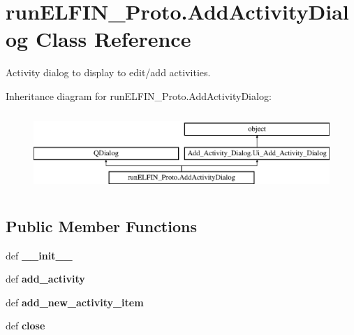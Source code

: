 \hypertarget{classrunELFIN__Proto_1_1AddActivityDialog}{\section{run\-E\-L\-F\-I\-N\-\_\-\-Proto.\-Add\-Activity\-Dialog Class Reference}
\label{classrunELFIN__Proto_1_1AddActivityDialog}
}


Activity dialog to display to edit/add activities.  


Inheritance diagram for run\-E\-L\-F\-I\-N\-\_\-\-Proto.\-Add\-Activity\-Dialog\-:\begin{figure}[H]
\begin{center}
\leavevmode
\includegraphics[height=3.000000cm]{classrunELFIN__Proto_1_1AddActivityDialog}
\end{center}
\end{figure}
\subsection*{Public Member Functions}
\begin{DoxyCompactItemize}
\item 
\hypertarget{classrunELFIN__Proto_1_1AddActivityDialog_a471b245c26d4148a8c9575e8ce075c5b}{def {\bfseries \-\_\-\-\_\-init\-\_\-\-\_\-}}\label{classrunELFIN__Proto_1_1AddActivityDialog_a471b245c26d4148a8c9575e8ce075c5b}

\item 
\hypertarget{classrunELFIN__Proto_1_1AddActivityDialog_a154107cc596262338c88ecd63713cef5}{def {\bfseries add\-\_\-activity}}\label{classrunELFIN__Proto_1_1AddActivityDialog_a154107cc596262338c88ecd63713cef5}

\item 
\hypertarget{classrunELFIN__Proto_1_1AddActivityDialog_a2dbd21f4cd94130413857ac9954fc325}{def {\bfseries add\-\_\-new\-\_\-activity\-\_\-item}}\label{classrunELFIN__Proto_1_1AddActivityDialog_a2dbd21f4cd94130413857ac9954fc325}

\item 
\hypertarget{classrunELFIN__Proto_1_1AddActivityDialog_a13af5c9e50240aa9b2ec22709ff4b8be}{def {\bfseries close}}\label{classrunELFIN__Proto_1_1AddActivityDialog_a13af5c9e50240aa9b2ec22709ff4b8be}

\end{DoxyCompactItemize}

